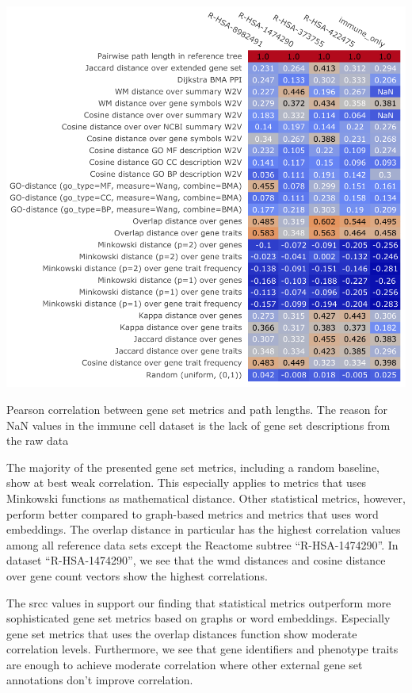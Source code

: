 \documentclass{thesisclass}
\begin{document}
\begin{centeredFigure}[!ht]
	\includegraphics[scale=0.85]{figures/results/plots/summary/pearson.pdf}
	\caption[Pearson correlation between gene set metrics and path lengths]{Pearson correlation between gene set metrics and path lengths. The reason for NaN values in the immune cell dataset is the lack of gene set descriptions from the raw data}
	\label{fig:pearson}
\end{centeredFigure}

The majority of the presented gene set metrics, including a random baseline, show  at best weak correlation.
This especially applies to metrics that uses Minkowski functions as mathematical distance.
Other statistical metrics, however, perform better compared to graph-based metrics and metrics that uses word embeddings.
The overlap distance in particular has the highest correlation values among all reference data sets except the Reactome subtree ``R-HSA-1474290''.
In dataset ``R-HSA-1474290'', we see that the \acrshort{wmd} distances and cosine distance over gene count vectors show the highest correlations.

The \acrshort{srcc} values in  support our finding that statistical metrics outperform more sophisticated gene set metrics based on graphs or word embeddings. Especially gene set metrics that uses the overlap distances function show moderate correlation levels. 
Furthermore, we see that gene identifiers and phenotype traits are enough to achieve moderate correlation where other external gene set annotations don't improve correlation.
\end{document}
